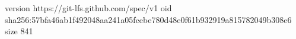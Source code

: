 version https://git-lfs.github.com/spec/v1
oid sha256:57bfa46ab1f492048aa241a05fcebe780d48e0f61b932919a815782049b308e6
size 841
